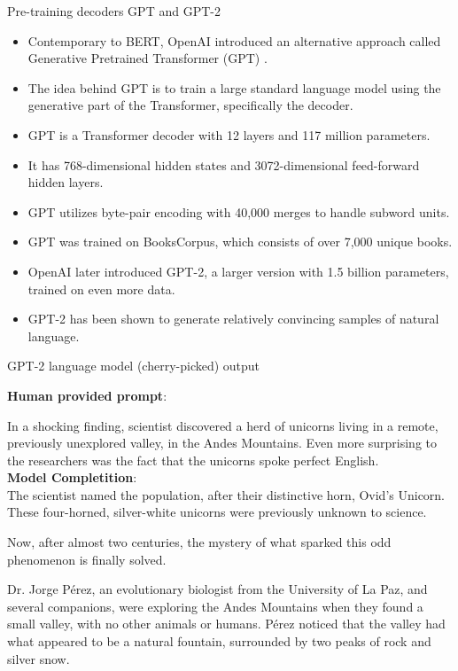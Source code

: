 \documentclass[handout]{beamer}
\begin{document}
\begin{frame}{Pre-training decoders GPT and GPT-2}


\begin{scriptsize}
\begin{itemize}
\item Contemporary to BERT, OpenAI introduced an alternative approach called Generative Pretrained Transformer (GPT) \cite{radford2018improving}.
\item The idea behind GPT is to train a large standard language model using the generative part of the Transformer, specifically the decoder.
\item GPT is a Transformer decoder with 12 layers and 117 million parameters.
\item It has 768-dimensional hidden states and 3072-dimensional feed-forward hidden layers.
\item GPT utilizes byte-pair encoding with 40,000 merges to handle subword units.
\item GPT was trained on BooksCorpus, which consists of over 7,000 unique books.
\item OpenAI later introduced GPT-2, a larger version with 1.5 billion parameters, trained on even more data.
\item GPT-2 has been shown to generate relatively convincing samples of natural language.
\end{itemize}


\end{scriptsize}

\end{frame}


\begin{frame}{GPT-2 language model (cherry-picked) output}
\begin{scriptsize}


\textbf{Human provided prompt}:

In a shocking finding, scientist discovered a herd of unicorns living in a remote, previously unexplored valley, in the Andes Mountains. Even more surprising to the researchers was the fact that the unicorns spoke perfect English. \\ 
\textbf{Model Completition}: \\ 

The scientist named the population, after their distinctive horn, Ovid’s Unicorn. These four-horned, silver-white unicorns were previously unknown to science.

Now, after almost two centuries, the mystery of what sparked this odd phenomenon is finally solved.

Dr. Jorge Pérez, an evolutionary biologist from the University of La Paz, and several companions, were exploring the Andes Mountains when they found a small valley, with no other animals or humans. Pérez noticed that the valley had what appeared to be a natural fountain, surrounded by two peaks of rock and silver snow.


\end{scriptsize}
\end{frame}
\end{document}

